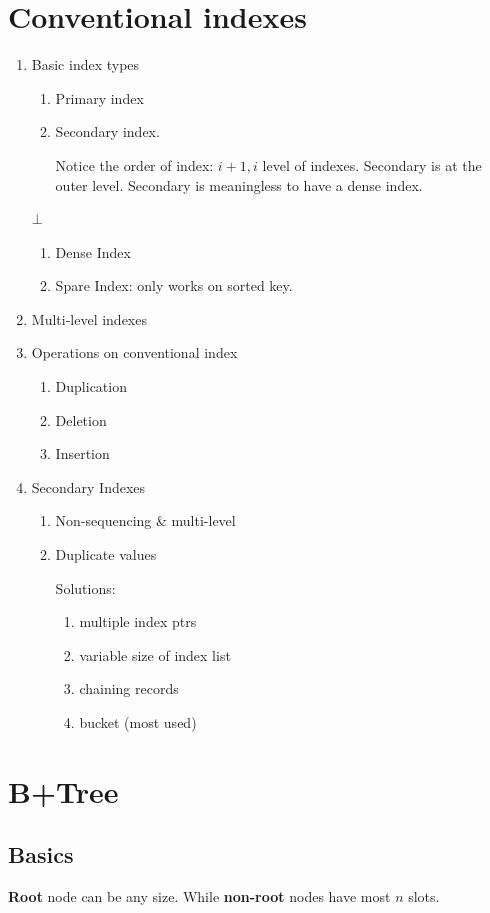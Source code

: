 \documentclass[a4paper]{report}
\begin{document}
\section{Conventional indexes}
\begin{enumerate}
\item Basic index types
  \begin{enumerate}
  \item Primary index
  \item Secondary index. 

  Notice the order of index: $i+1, i$ level of indexes. Secondary is at the outer level. Secondary is meaningless to have a dense index. 
  
  
  
  \end{enumerate}
  $\bot$
  \begin{enumerate}
  \item Dense Index
  \item Spare Index: only works on sorted key. 
  \end{enumerate}
\item Multi-level indexes
\item Operations on conventional index
  \begin{enumerate}
  \item Duplication
  \item Deletion
  \item Insertion
  \end{enumerate}
\item Secondary Indexes
  \begin{enumerate}
  \item Non-sequencing \& multi-level
  \item Duplicate values
  
  Solutions:
    \begin{enumerate}
    \item multiple index ptrs
    \item variable size of index list 
    \item chaining records 
    \item bucket (most used)
    \end{enumerate}
  \end{enumerate}
\end{enumerate}
\section{B+Tree}
\subsection{Basics}
\textbf{Root} node can be any size. While \textbf{non-root} nodes have most $n$ slots.
\end{document}
